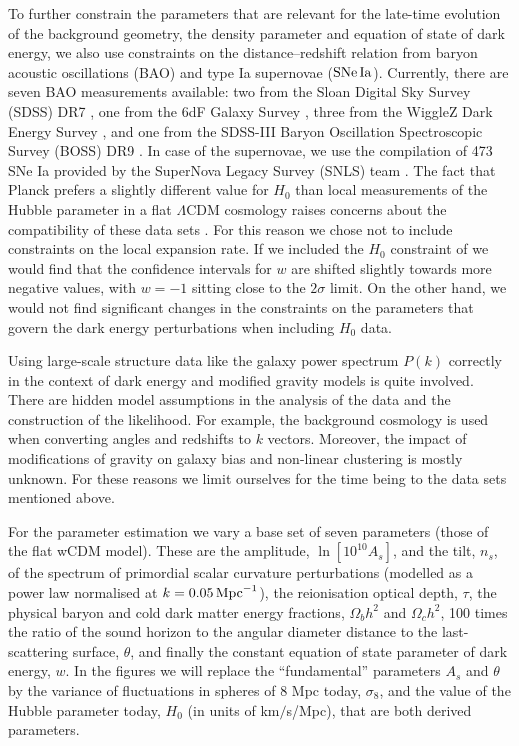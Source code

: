 To further constrain the parameters that are relevant for the late-time evolution of the background geometry, the density parameter and equation of state of dark energy, we also use constraints on the distance--redshift relation from baryon acoustic oscillations (BAO) and type Ia supernovae ($\mathrm{SNe\,Ia}$). Currently, there are seven BAO measurements available: two from the Sloan Digital Sky Survey (SDSS) DR7 
\cite{Percival:2009xn,Padmanabhan:2012hf}, one from the 6dF Galaxy Survey 
\cite{Beutler:2011hx}, three from the WiggleZ Dark Energy Survey 
\cite{Blake:2011en}, and one from the SDSS-III Baryon Oscillation Spectroscopic Survey (BOSS) DR9 
\cite{Anderson:2012sa}. In case of the supernovae, we use the compilation of 473 SNe Ia provided by the SuperNova Legacy Survey (SNLS) team \cite{Conley:2011ku}.
The fact that Planck prefers a slightly different value for $H_0$ than local measurements of the Hubble parameter in a flat $\Lambda$CDM cosmology raises concerns about the compatibility of these data sets \cite{Ade:2013zuv}. For this reason we chose not to include constraints on the local expansion rate. If we included
the $H_0$ constraint of \cite{Riess:2011yx} we would find that the confidence intervals for $w$ are shifted slightly towards more
negative values, with $w = -1$ sitting close to the $2 \sigma$
limit. On the other hand, we would not find significant changes in the
constraints on the parameters that govern the dark energy
perturbations when including $H_0$ data.

Using large-scale structure data like the galaxy power spectrum $P(k)$ correctly in the context
of dark energy and modified gravity models is quite involved. There are hidden model assumptions
in the analysis of the data and the construction of the likelihood. For example, the background cosmology
is used when
converting angles and redshifts to $k$ vectors. Moreover, the impact of modifications of  
gravity on galaxy bias and non-linear clustering is mostly unknown. For these reasons we limit ourselves for the time
being to the data sets mentioned above.

For the parameter estimation we vary a base set of seven parameters (those of the flat wCDM model). These are the amplitude, $\ln[10^{10}A_s]$, and the tilt, $n_s$, of the spectrum of primordial scalar curvature perturbations (modelled as a power law normalised at $k=0.05\,{\rm Mpc}^{-1}$), the reionisation optical depth, $\tau$, the physical baryon and cold dark matter energy fractions, $\Omega_b h^2$ and $\Omega_c h^2$, 100 times the ratio of the sound horizon to the angular diameter distance to the last-scattering surface, $\theta$, and finally the constant equation of state parameter of dark energy, $w$. In the figures we will replace the ``fundamental'' parameters $A_s$ and $\theta$ by the variance of fluctuations in spheres of 8 Mpc today, $\sigma_8$, and the value of the Hubble parameter today, $H_0$ (in units of km$/$s/Mpc), that are both derived parameters.

